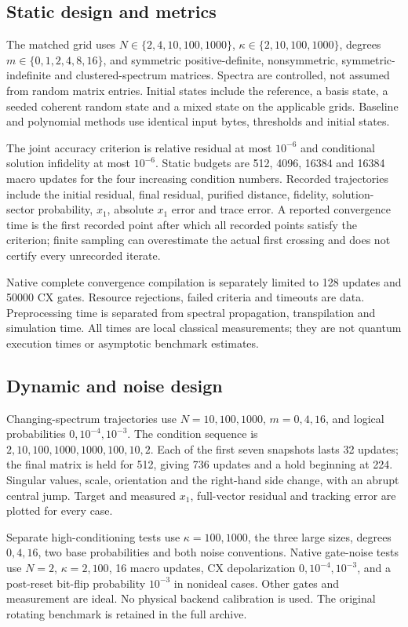 \documentclass{ieeeaccess}
\begin{document}
\subsection{Static design and metrics}
The matched grid uses $N\in\{2,4,10,100,1000\}$, $\kappa\in\{2,10,100,1000\}$, degrees $m\in\{0,1,2,4,8,16\}$, and symmetric positive-definite, nonsymmetric, symmetric-indefinite and clustered-spectrum matrices. Spectra are controlled, not assumed from random matrix entries. Initial states include the reference, a basis state, a seeded coherent random state and a mixed state on the applicable grids. Baseline and polynomial methods use identical input bytes, thresholds and initial states.

The joint accuracy criterion is relative residual at most $10^{-6}$ and conditional solution infidelity at most $10^{-6}$. Static budgets are 512, 4096, 16384 and 16384 macro updates for the four increasing condition numbers. Recorded trajectories include the initial residual, final residual, purified distance, fidelity, solution-sector probability, $x_1$, absolute $x_1$ error and trace error. A reported convergence time is the first recorded point after which all recorded points satisfy the criterion; finite sampling can overestimate the actual first crossing and does not certify every unrecorded iterate.

Native complete convergence compilation is separately limited to 128 updates and 50000 CX gates. Resource rejections, failed criteria and timeouts are data. Preprocessing time is separated from spectral propagation, transpilation and simulation time. All times are local classical measurements; they are not quantum execution times or asymptotic benchmark estimates.

\subsection{Dynamic and noise design}
Changing-spectrum trajectories use $N=10,100,1000$, $m=0,4,16$, and logical probabilities $0,10^{-4},10^{-3}$. The condition sequence is $2,10,100,1000,1000,100,10,2$. Each of the first seven snapshots lasts 32 updates; the final matrix is held for 512, giving 736 updates and a hold beginning at 224. Singular values, scale, orientation and the right-hand side change, with an abrupt central jump. Target and measured $x_1$, full-vector residual and tracking error are plotted for every case.

Separate high-conditioning tests use $\kappa=100,1000$, the three large sizes, degrees $0,4,16$, two base probabilities and both noise conventions. Native gate-noise tests use $N=2$, $\kappa=2,100$, 16 macro updates, CX depolarization $0,10^{-4},10^{-3}$, and a post-reset bit-flip probability $10^{-3}$ in nonideal cases. Other gates and measurement are ideal. No physical backend calibration is used. The original rotating benchmark is retained in the full archive.
\end{document}
